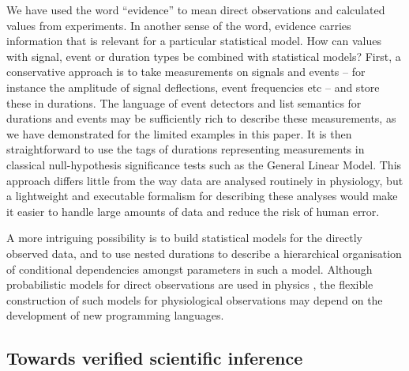 We have used the word ``evidence'' to mean direct observations and
calculated values from experiments. In another sense of the word,
evidence carries information that is relevant for a particular
statistical model. How can values with signal, event or duration types
be combined with statistical models? First, a conservative approach is
to take measurements on signals and events -- for instance the
amplitude of signal deflections, event frequencies etc -- and store
these in durations. The language of event detectors and list semantics
for durations and events may be sufficiently rich to describe these
measurements, as we have demonstrated for the limited examples in this
paper. It is then straightforward to use the tags of durations
representing measurements in classical null-hypothesis significance
tests such as the General Linear Model. This approach differs little
from the way data are analysed routinely in physiology, but a
lightweight and executable formalism for describing these analyses
would make it easier to handle large amounts of data and reduce the
risk of human error.

A more intriguing possibility is to build statistical models for the
directly observed data, and to use nested durations to describe a
hierarchical organisation of conditional dependencies amongst
parameters in such a model. Although probabilistic models for direct
observations are used in physics \citep{Daniell1991}, the flexible
construction of such models for physiological observations may depend
on the development of new programming languages.

\subsection*{Towards verified scientific inference}

